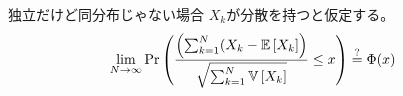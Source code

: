\documentclass[lualatex,handout]{beamer}
\newcommand{\expt}[1]{\mathbb{E}\left[#1\right]}
\newcommand{\var}[1]{\mathbb{V}\left[#1\right]}
\theoremstyle{definition}
\begin{document}
\begin{frame}{独立だけど同分布じゃない場合}
$X_k$が分散を持つと仮定する。
\begin{align*}
\lim_{N\to\infty}\Pr\left(\frac{\left(\sum_{k=1}^N (X_k-\expt{X_k}\right)}{\sqrt{\sum_{k=1}^N\var{X_k}}} \le x\right) &\stackrel{\large ?}{=} \Phi(x)
\end{align*}
\end{frame}
\fi
\end{document}
